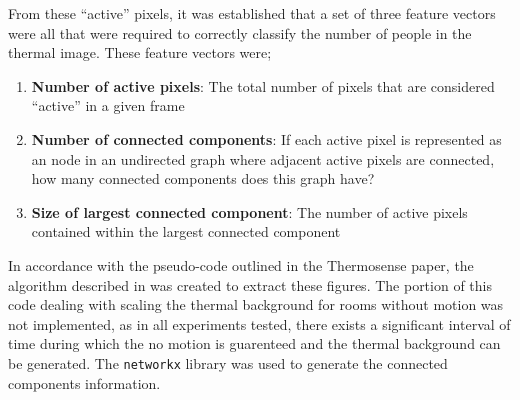 \documentclass[../thesis/thesis.tex]{subfiles}
\begin{document}
From these ``active'' pixels, it was established that a set of three feature vectors were all that were required to correctly classify the number of people in the thermal image. These feature vectors were;
\begin{enumerate}
\item \textbf{Number of active pixels}: The total number of pixels that are considered ``active'' in a given frame
\item \textbf{Number of connected components}: If each active pixel is represented as an node in an undirected graph where adjacent active pixels are connected, how many connected components does this graph have?
\item \textbf{Size of largest connected component}: The number of active pixels contained within the largest connected component
\end{enumerate}

In accordance with the pseudo-code outlined in the Thermosense paper, the algorithm described in  was created to extract these figures. The portion of this code dealing with scaling the thermal background for rooms without motion was not implemented, as in all experiments tested, there exists a significant interval of time during which the no motion is guarenteed and the thermal background can be generated. The \texttt{networkx} library was used to generate the connected components information.
\end{document}
